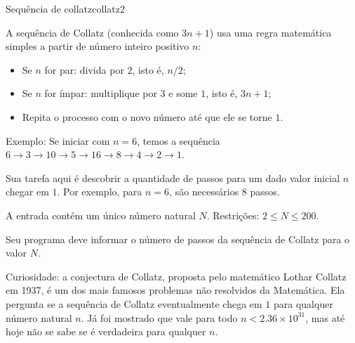 \documentclass[12pt,a4paper,oneside]{article}
\begin{document}
\begin{problem}{Sequência de collatz}{collatz}{2}

A sequência de Collatz (conhecida como $3n+1$) usa uma regra matemática simples a partir de número inteiro positivo $n$:

\begin{itemize}
\item Se $n$ for par: divida por $2$, isto é, $n/2$;
\item Se $n$ for ímpar: multiplique por $3$ e some $1$, isto é, $3n+1$;
\item Repita o processo com o novo número até que ele se torne $1$.
\end{itemize}

Exemplo: Se iniciar com $n=6$, temos a sequência $6 \rightarrow 3 \rightarrow 10 \rightarrow 5 \rightarrow 16 \rightarrow 8 \rightarrow 4 \rightarrow 2 \rightarrow 1$.

Sua tarefa aqui é descobrir a quantidade de passos para um dado valor inicial $n$ chegar em $1$.
Por exemplo, para $n=6$, são necessários 8 passos.

%

\InputFile

A entrada contém um único número natural $N$. Restrições: $2 \leq N \leq 200$.

\OutputFile

Seu programa deve informar o número de passos da sequência de Collatz para o valor $N$.


\Example

\begin{example}
%
\end{example}

\begin{example}
%
\end{example}

\begin{example}
%
\end{example}

\Notes
Curiosidade: a conjectura de Collatz, proposta pelo matemático Lothar Collatz em 1937, é um dos mais famosos problemas não resolvidos da Matemática.
Ela pergunta se a sequência de Collatz eventualmente chega em $1$ para qualquer número natural $n$. Já foi mostrado que vale para todo $n < 2.36 \times 10^{31}$, mas até hoje não se sabe se é verdadeira para qualquer $n$.

\end{problem}
\end{document}

